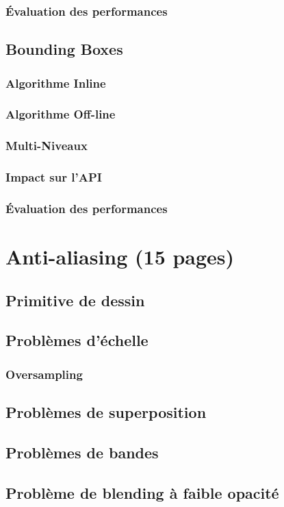 		\subsection{Évaluation des performances}
	\section{Bounding Boxes}
		\subsection{Algorithme Inline}
		\subsection{Algorithme Off-line}
		\subsection{Multi-Niveaux}
		\subsection{Impact sur l'API}
		\subsection{Évaluation des performances}

\chapter{Anti-aliasing (15 pages) }
	\section{Primitive de dessin}
	\section{Problèmes d'échelle}
		\subsection{Oversampling}
	\section{Problèmes de superposition}
	\section{Problèmes de bandes}
	\section{Problème de blending à faible opacité}

